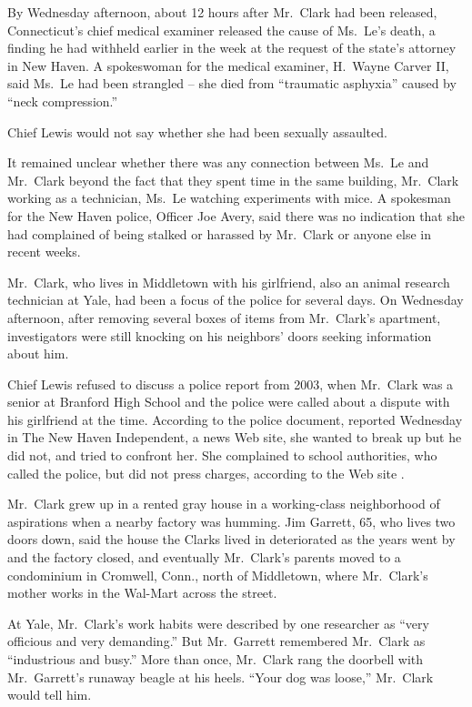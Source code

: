 ﻿\documentclass[12pt]{article}
\begin{document}
By Wednesday afternoon, about 12 hours after Mr.~Clark had been released, Connecticut's chief
medical examiner released the cause of Ms.~Le's death, a finding he had withheld earlier in the week
at the request of the state's attorney in New Haven. A spokeswoman for the medical examiner,
H.~Wayne Carver II, said Ms.~Le had been strangled -- she died from ``traumatic asphyxia'' caused by
``neck compression.''

Chief Lewis would not say whether she had been sexually assaulted.

It remained unclear whether there was any connection between Ms.~Le and Mr.~Clark beyond the fact
that they spent time in the same building, Mr.~Clark working as a technician, Ms.~Le watching
experiments with mice. A spokesman for the New Haven police, Officer Joe Avery, said there was no
indication that she had complained of being stalked or harassed by Mr.~Clark or anyone else in
recent weeks.

Mr.~Clark, who lives in Middletown with his girlfriend, also an animal research technician at Yale,
had been a focus of the police for several days. On Wednesday afternoon, after removing several
boxes of items from Mr.~Clark's apartment, investigators were still knocking on his neighbors' doors
seeking information about him.

Chief Lewis refused to discuss a police report from 2003, when Mr.~Clark was a senior at Branford
High School and the police were called about a dispute with his girlfriend at the time. According to
the police document, reported Wednesday in The New Haven Independent, a news Web site, she wanted to
break up but he did not, and tried to confront her. She complained to school authorities, who called
the police, but did not press charges, according to the Web site .

Mr.~Clark grew up in a rented gray house in a working-class neighborhood of aspirations when a
nearby factory was humming. Jim Garrett, 65, who lives two doors down, said the house the Clarks
lived in deteriorated as the years went by and the factory closed, and eventually Mr.~Clark's
parents moved to a condominium in Cromwell, Conn., north of Middletown, where Mr.~Clark's mother
works in the Wal-Mart across the street.

At Yale, Mr.~Clark's work habits were described by one researcher as ``very officious and very
demanding.'' But Mr.~Garrett remembered Mr.~Clark as ``industrious and busy.'' More than once,
Mr.~Clark rang the doorbell with Mr.~Garrett's runaway beagle at his heels. ``Your dog was loose,''
Mr.~Clark would tell him.
\end{document}
